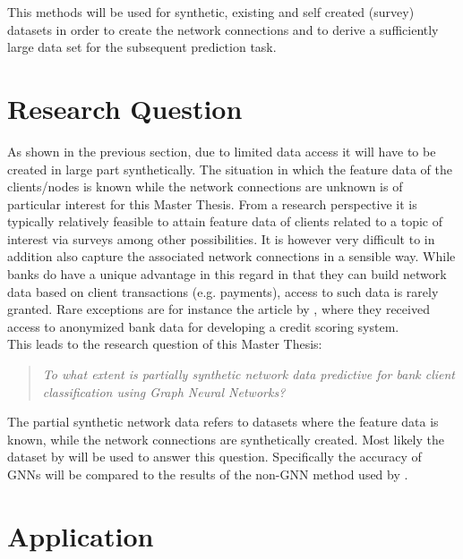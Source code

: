 \documentclass[12pt,a4paper]{article}
\begin{document}
	\noindent This methods will be used for synthetic, existing and self created (survey) datasets in order to create the network connections and to 
	derive a sufficiently large data set for the subsequent prediction task. 

	\section{Research Question}

	As shown in the previous section, due to limited data access it will have to be created in large part synthetically. The situation in which the 
	feature data of the clients/nodes is known while the network connections are unknown is of particular interest for this Master Thesis. From a 
	research perspective it is typically relatively feasible to attain feature data of clients related to a topic of interest via surveys among other 
	possibilities. It is however very difficult to in addition also capture the associated network connections in a sensible way. While banks 
	do have a unique advantage in this regard in that they can build network data based on client transactions (e.g. payments), access to such data is
	rarely granted. Rare exceptions are for instance the article by \citet{sukharev2020ews}, where they received access to anonymized bank data for
	developing a credit scoring system. \\

	\noindent This leads to the research question of this Master Thesis:

	\begin{quote}
		\textit{To what extent is partially synthetic network data predictive for bank client classification using Graph Neural Networks?} 
	\end{quote}
	
	\noindent The partial synthetic network data refers to datasets where the feature data is known, while the network connections are synthetically 
	created. Most likely the dataset by \citet{moro2014data} will be used to answer this question. Specifically the accuracy of GNNs will be compared
	to the results of the non-GNN method used by \citet{moro2014data}. \\

	\section{Application}
\end{document}

